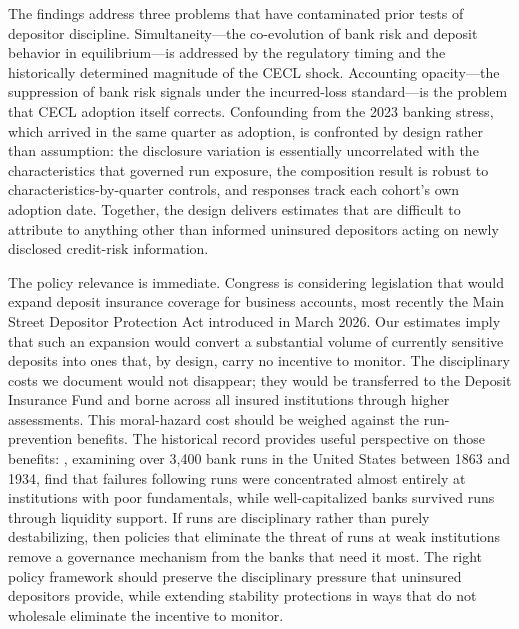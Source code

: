 The findings address three problems that have contaminated prior tests of
depositor discipline.  Simultaneity---the co-evolution of bank risk and deposit
behavior in equilibrium---is addressed by the regulatory timing and the
historically determined magnitude
of the CECL shock.  Accounting opacity---the suppression of bank risk signals
under the incurred-loss standard---is the problem that CECL adoption itself
corrects.  Confounding from the 2023 banking stress, which arrived in the same
quarter as adoption, is confronted by design rather than assumption: the
disclosure variation is essentially uncorrelated with the characteristics that
governed run exposure, the composition result is robust to
characteristics-by-quarter controls, and responses track each cohort's own
adoption date.  Together, the design delivers estimates that are difficult
to attribute to anything other than informed uninsured depositors acting on newly
disclosed credit-risk information.

The policy relevance is immediate.  Congress is considering legislation that would
expand deposit insurance coverage for business accounts, most recently the Main
Street Depositor Protection Act introduced in March 2026.  Our estimates imply
that such an expansion would convert a substantial volume of currently sensitive
deposits into ones that, by design, carry no incentive to monitor.  The
disciplinary costs we document would not disappear; they would be transferred to
the Deposit Insurance Fund and borne across all insured institutions through
higher assessments.  This moral-hazard cost should be weighed against the
run-prevention benefits.  The historical record provides useful perspective on
those benefits: \citet{correia2026bank}, examining over 3{,}400 bank runs in
the United States between 1863 and 1934, find that failures following runs were
concentrated almost entirely at institutions with poor fundamentals, while
well-capitalized banks survived runs through liquidity support.  If runs are
disciplinary rather than purely destabilizing, then policies that eliminate the
threat of runs at weak institutions remove a governance mechanism from the banks
that need it most.  The right policy framework should preserve the disciplinary
pressure that uninsured depositors provide, while extending stability protections
in ways that do not wholesale eliminate the incentive to monitor.
